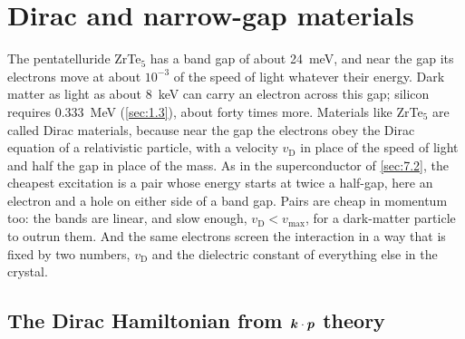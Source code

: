 \section{Dirac and narrow-gap materials}\label{sec:7.3}

The pentatelluride ZrTe$_5$ has a band gap of about \SI{24}{meV}, and near the gap its electrons move at about $10^{-3}$ of the speed of light whatever their energy. Dark matter as light as about \SI{8}{keV} can carry an electron across this gap; silicon requires \SI{0.333}{MeV} (\cref{sec:1.3}), about forty times more. Materials like ZrTe$_5$ are called Dirac materials, because near the gap the electrons obey the Dirac equation of a relativistic particle, with a velocity $v_{\mathrm{D}}$ in place of the speed of light and half the gap in place of the mass. As in the superconductor of \cref{sec:7.2}, the cheapest excitation is a pair whose energy starts at twice a half-gap, here an electron and a hole on either side of a band gap. Pairs are cheap in momentum too: the bands are linear, and slow enough, $v_{\mathrm{D}} < v_{\mathrm{max}}$, for a dark-matter particle to outrun them. And the same electrons screen the interaction in a way that is fixed by two numbers, $v_{\mathrm{D}}$ and the dielectric constant of everything else in the crystal.

\subsection{The Dirac Hamiltonian from \texorpdfstring{$\bm{k}\cdot\bm{p}$}{k.p} theory}

